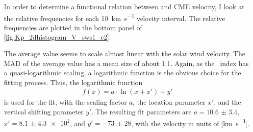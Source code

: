 In order to determine a functional relation between \Kp{} and CME velocity, I look at the relative \Kp{} frequencies for each \SI{10}{\km\per\s} velocity interval. The relative frequencies are plotted in the bottom panel of \autoref{fig:Kp_2dhistogram_V_sws1_c2}.
\begin{figure}[htb]
\end{figure}
The average \Kp{} value seems to scale almost linear with the solar wind velocity. The MAD of the average \Kp{} value has a mean \Kp{} size of about \num{1.1}.
Again, as the \Kp~index has a quasi-logarithmic scaling, a logarithmic function is the obvious choice for the fitting process. Thus, the logarithmic function
\begin{align}
	f(x) = a \cdot \ln\left(x + x'\right) + y'	\label{eq:log_offset_fit_function}
\end{align}
is used for the fit, with the scaling factor $a$, the location parameter $x'$, and the vertical shifting parameter $y'$. The resulting fit parameters are $a = \num{10.6(34)}$, $x' = \num{8.1(43)e2}$, and $y' = \num{-73(28)}$, with the velocity in units of [\si{\km\per\s}].
